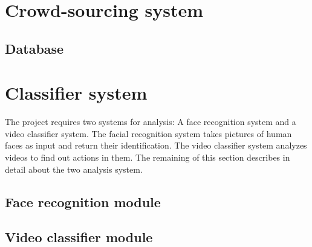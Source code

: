 \section{Crowd-sourcing system}
\subsection{Database}
\section{Classifier system}
The project requires two systems for analysis: A face recognition system and a video classifier system. The facial recognition system takes pictures of human faces as input and return their identification. The video classifier system analyzes videos to find out actions in them. The remaining of this section describes in detail about the two analysis system.
\subsection{Face recognition module}
\subsection{Video classifier module}

